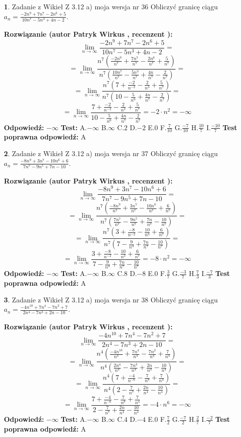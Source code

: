 \documentclass[12pt, a4paper]{article}
\theoremstyle{definition} %
\newtheorem{zad}{}
\newcommand{\zadStart}[1]{\begin{zad}#1\newline}
\newcommand{\zadStop}{\end{zad}}
\newcommand{\rozwStart}[2]{\noindent \textbf{Rozwiązanie (autor #1 , recenzent #2): }\newline}
\newcommand{\rozwStop}{\newline}
\newcommand{\odpStart}{\noindent \textbf{Odpowiedź:}\newline}
\newcommand{\odpStop}{\newline}
\newcommand{\testStart}{\noindent \textbf{Test:}\newline}
\newcommand{\testStop}{\newline}
\newcommand{\kluczStart}{\noindent \textbf{Test poprawna odpowiedź:}\newline}
\newcommand{\kluczStop}{\newline}
\begin{document}
\zadStart{Zadanie z Wikieł Z 3.12 a) moja wersja nr 36}
Obliczyć granicę ciągu $a_{n}=\frac{-2n^{9}+7n^{7}-2n^{6}+5}{10n^{7}-5n^{3}+4n-2}$.
\zadStop
\rozwStart{Patryk Wirkus}{}
$$\lim\limits_{n\to\infty}\frac{-2n^{9}+7n^{7}-2n^{6}+5}{10n^{7}-5n^{3}+4n-2}=$$
$$=\lim\limits_{n\to\infty}\frac{n^{7}\left(\frac{-2n^{9}}{n^{7}}+\frac{7n^{7}}{n^{7}}-\frac{2n^{6}}{n^{7}}+\frac{5}{n^{7}}\right)}{n^{7}\left(\frac{10n^{7}}{n^{7}}-\frac{5n^{3}}{n^{7}}+\frac{4n}{n^{7}}-\frac{2}{n^{7}}\right)}=$$
$$=\lim\limits_{n\to\infty}\frac{n^{7}\left(7+\frac{-2}{n^{-2}}-\frac{2}{n^{3}}+\frac{5}{n^{7}}\right)}
{n^{7}\left(10-\frac{5}{n^{6}}+\frac{4n}{n^{7}}-\frac{2}{n^{7}}\right)}=$$
$$=\lim\limits_{n\to\infty}\frac{7+\frac{-2}{n^{-2}}-\frac{2}{n^{3}}+\frac{5}{n^{7}}}{10-\frac{5}{n^{6}}+\frac{4n}{n^{7}}-\frac{2}{n^{7}}}=-2\cdot n^{2} = -\infty$$
\rozwStop
\odpStart
$-\infty$
\odpStop
\testStart
A.$-\infty$
B.$\infty$
C.$2$
D.$-2$
E.$0$
F.$\frac{7}{10}$
G.$\frac{-7}{10}$
H.$\frac{10}{7}$
I.$\frac{-10}{7}$
\testStop
\kluczStart
A
\kluczStop



\zadStart{Zadanie z Wikieł Z 3.12 a) moja wersja nr 37}
Obliczyć granicę ciągu $a_{n}=\frac{-8n^{9}+3n^{7}-10n^{6}+6}{7n^{7}-9n^{5}+7n-10}$.
\zadStop
\rozwStart{Patryk Wirkus}{}
$$\lim\limits_{n\to\infty}\frac{-8n^{9}+3n^{7}-10n^{6}+6}{7n^{7}-9n^{5}+7n-10}=$$
$$=\lim\limits_{n\to\infty}\frac{n^{7}\left(\frac{-8n^{9}}{n^{7}}+\frac{3n^{7}}{n^{7}}-\frac{10n^{6}}{n^{7}}+\frac{6}{n^{7}}\right)}{n^{7}\left(\frac{7n^{7}}{n^{7}}-\frac{9n^{5}}{n^{7}}+\frac{7n}{n^{7}}-\frac{10}{n^{7}}\right)}=$$
$$=\lim\limits_{n\to\infty}\frac{n^{7}\left(3+\frac{-8}{n^{-2}}-\frac{10}{n^{3}}+\frac{6}{n^{7}}\right)}
{n^{7}\left(7-\frac{9}{n^{4}}+\frac{7n}{n^{7}}-\frac{10}{n^{7}}\right)}=$$
$$=\lim\limits_{n\to\infty}\frac{3+\frac{-8}{n^{-2}}-\frac{10}{n^{3}}+\frac{6}{n^{7}}}{7-\frac{9}{n^{4}}+\frac{7n}{n^{7}}-\frac{10}{n^{7}}}=-8\cdot n^{2} = -\infty$$
\rozwStop
\odpStart
$-\infty$
\odpStop
\testStart
A.$-\infty$
B.$\infty$
C.$8$
D.$-8$
E.$0$
F.$\frac{3}{7}$
G.$\frac{-3}{7}$
H.$\frac{7}{3}$
I.$\frac{-7}{3}$
\testStop
\kluczStart
A
\kluczStop



\zadStart{Zadanie z Wikieł Z 3.12 a) moja wersja nr 38}
Obliczyć granicę ciągu $a_{n}=\frac{-4n^{10}+7n^{4}-7n^{2}+7}{2n^{4}-7n^{3}+2n-10}$.
\zadStop
\rozwStart{Patryk Wirkus}{}
$$\lim\limits_{n\to\infty}\frac{-4n^{10}+7n^{4}-7n^{2}+7}{2n^{4}-7n^{3}+2n-10}=$$
$$=\lim\limits_{n\to\infty}\frac{n^{4}\left(\frac{-4n^{10}}{n^{4}}+\frac{7n^{4}}{n^{4}}-\frac{7n^{2}}{n^{4}}+\frac{7}{n^{4}}\right)}{n^{4}\left(\frac{2n^{4}}{n^{4}}-\frac{7n^{3}}{n^{4}}+\frac{2n}{n^{4}}-\frac{10}{n^{4}}\right)}=$$
$$=\lim\limits_{n\to\infty}\frac{n^{4}\left(7+\frac{-4}{n^{-6}}-\frac{7}{n^{8}}+\frac{7}{n^{4}}\right)}
{n^{4}\left(2-\frac{7}{n^{7}}+\frac{2n}{n^{4}}-\frac{10}{n^{4}}\right)}=$$
$$=\lim\limits_{n\to\infty}\frac{7+\frac{-4}{n^{-6}}-\frac{7}{n^{8}}+\frac{7}{n^{4}}}{2-\frac{7}{n^{7}}+\frac{2n}{n^{4}}-\frac{10}{n^{4}}}=-4\cdot n^{6} = -\infty$$
\rozwStop
\odpStart
$-\infty$
\odpStop
\testStart
A.$-\infty$
B.$\infty$
C.$4$
D.$-4$
E.$0$
F.$\frac{7}{2}$
G.$\frac{-7}{2}$
H.$\frac{2}{7}$
I.$\frac{-2}{7}$
\testStop
\kluczStart
A
\kluczStop
\end{document}

